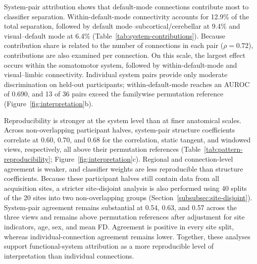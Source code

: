 System-pair attribution shows that default-mode connections contribute most to classifier separation. Within-default-mode connectivity accounts for 12.9\% of the total separation, followed by default mode--subcortical/cerebellar at 9.4\% and visual--default mode at 6.4\% (Table~\ref{tab:system-contributions}). Because contribution share is related to the number of connections in each pair ($\rho=0.72$), contributions are also examined per connection. On this scale, the largest effect occurs within the somatomotor system, followed by within-default-mode and visual--limbic connectivity. Individual system pairs provide only moderate discrimination on held-out participants; within-default-mode reaches an AUROC of 0.690, and 13 of 36 pairs exceed the familywise permutation reference (Figure~\ref{fig:interpretation}b).

Reproducibility is stronger at the system level than at finer anatomical scales. Across non-overlapping participant halves, system-pair structure coefficients correlate at 0.60, 0.70, and 0.68 for the correlation, static tangent, and windowed views, respectively, all above their permutation references (Table~\ref{tab:pattern-reproducibility}; Figure~\ref{fig:interpretation}c). Regional and connection-level agreement is weaker, and classifier weights are less reproducible than structure coefficients. Because these participant halves still contain data from all acquisition sites, a stricter site-disjoint analysis is also performed using 40 splits of the 20 sites into two non-overlapping groups (Section~\ref{subsubsec:site-disjoint}). System-pair agreement remains substantial at 0.54, 0.63, and 0.57 across the three views and remains above permutation references after adjustment for site indicators, age, sex, and mean FD. Agreement is positive in every site split, whereas individual-connection agreement remains lower. Together, these analyses support functional-system attribution as a more reproducible level of interpretation than individual connections.


